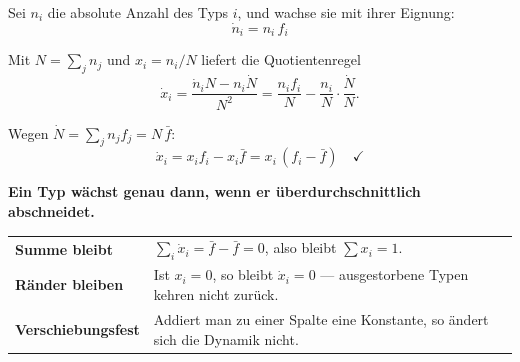 \begin{merksatz}
Sei $n_i$ die absolute Anzahl des Typs $i$, und wachse sie mit ihrer Eignung:
\[ \dot n_i = n_i\,f_i \]

Mit $N = \sum_j n_j$ und $x_i = n_i/N$ liefert die Quotientenregel
\[ \dot x_i = \frac{\dot n_i N - n_i \dot N}{N^{2}} = \frac{n_i f_i}{N} - \frac{n_i}{N}\cdot\frac{\dot N}{N} . \]

Wegen $\dot N = \sum_j n_j f_j = N\,\bar f$:
\[ \dot x_i = x_i f_i - x_i \bar f = x_i\,(f_i - \bar f) \quad \checkmark \]

\begin{center}
\begin{minipage}{0.9\textwidth}
\textbf{Ein Typ wächst genau dann, wenn er überdurchschnittlich abschneidet.}
\end{minipage}
\end{center}

\begin{center}
\begin{minipage}{0.88\textwidth}
\end{minipage}
\end{center}

\begin{center}
{\small
\renewcommand{\arraystretch}{1.5}
\begin{tabular}{@{}P{2.8cm}P{5.8cm}@{}}
\toprule
\textbf{Summe bleibt} & $\sum_i \dot x_i = \bar f - \bar f = 0$, also bleibt $\sum x_i = 1$.\\
\textbf{Ränder bleiben} & Ist $x_i = 0$, so bleibt $\dot x_i = 0$ --- ausgestorbene Typen kehren nicht zurück.\\
\textbf{Verschiebungs\-fest} & Addiert man zu einer Spalte eine Konstante, so ändert sich die Dynamik nicht.\\
\bottomrule
\end{tabular}}
\end{center}

\begin{center}
\begin{minipage}{0.88\textwidth}
\end{minipage}
\end{center}
\end{merksatz}

